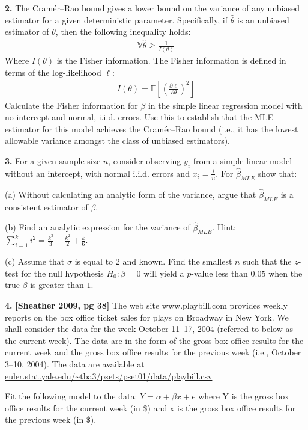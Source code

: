 \documentclass[12pt]{article}
\begin{document}
\bigskip

{\bf 2.} The Cramér–Rao bound gives a lower bound on the variance of any unbiased estimator
for a given deterministic parameter. Specifically, if $\widehat{\theta}$ is an unbiased
estimator of $\theta$, then the following inequality holds:
\begin{align}
\mathbb{V} \widehat{\theta} \geq \frac{1}{I(\theta)}
\end{align}
Where $I(\theta)$ is the Fisher information. The Fisher information is defined in terms
of the log-likelihood $\ell$:
\begin{align}
I(\theta) = \mathbb{E} \left[ \left( \frac{\partial \ell}{\partial \theta} \right)^2 \right]
\end{align}
Calculate the Fisher information for $\beta$ in the simple linear regression model with
no intercept and normal, i.i.d. errors. Use this to establish that the MLE estimator for
this model achieves the Cramér–Rao bound (i.e., it has the lowest allowable variance
amongst the class of unbiased estimators).

{\bf 3.} For a given sample size $n$, consider observing $y_i$ from a simple linear model
without an intercept, with normal i.i.d. errors and $x_i = \frac{i}{n}$.
For $\widehat{\beta}_{MLE}$ show that:

(a) Without calculating an analytic form of the variance, argue that $\widehat{\beta}_{MLE}$
is a consistent estimator of $\beta$.

(b) Find an analytic expression for the variance of $\widehat{\beta}_{MLE}$.
Hint: $\sum_{i=1}^k i^2 = \frac{k^3}{3} + \frac{k^2}{2} + \frac{k}{6}$.

(c) Assume that $\sigma$ is equal to $2$ and known. Find the smallest $n$ such that the $z$-test
for the null hypothesis $H_0: \beta = 0$ will yield a $p$-value less than $0.05$ when the
true $\beta$ is greater than $1$.

{\bf 4.} {\bf [Sheather 2009, pg 38]} The web site www.playbill.com provides weekly reports on the box office ticket sales for plays on Broadway in New York. We shall consider the data for the week October 11–17, 2004 (referred to below as the current week). The data are in the form of the gross box office results for the current week and the gross box office results for the previous week (i.e., October 3–10, 2004). The data are available at \url{euler.stat.yale.edu/~tba3/psets/pset01/data/playbill.csv}

Fit the following model to the data: $Y = \alpha + \beta x + e$ where Y is the gross box office results for the current week (in \$) and x is the gross box office results for the previous week (in \$).
\end{document}
